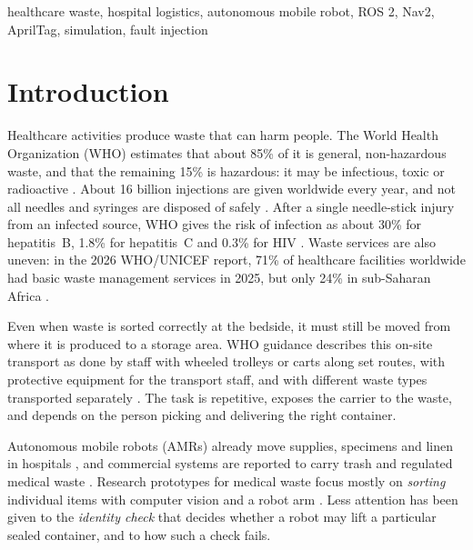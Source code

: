 \documentclass[conference]{IEEEtran}
\begin{document}
\begin{IEEEkeywords}
healthcare waste, hospital logistics, autonomous mobile robot, ROS 2, Nav2, AprilTag, simulation, fault injection
\end{IEEEkeywords}

\section{Introduction}
Healthcare activities produce waste that can harm people. The World Health Organization (WHO) estimates that about 85\% of it is general, non-hazardous waste, and that the remaining 15\% is hazardous: it may be infectious, toxic or radioactive \cite{who_hcw}. About 16 billion injections are given worldwide every year, and not all needles and syringes are disposed of safely \cite{who_hcw}. After a single needle-stick injury from an infected source, WHO gives the risk of infection as about 30\% for hepatitis~B, 1.8\% for hepatitis~C and 0.3\% for HIV \cite{who_injection}. Waste services are also uneven: in the 2026 WHO/UNICEF report, 71\% of healthcare facilities worldwide had basic waste management services in 2025, but only 24\% in sub-Saharan Africa \cite{jmp2026}.

Even when waste is sorted correctly at the bedside, it must still be moved from where it is produced to a storage area. WHO guidance describes this on-site transport as done by staff with wheeled trolleys or carts along set routes, with protective equipment for the transport staff, and with different waste types transported separately \cite{who_safe}. The task is repetitive, exposes the carrier to the waste, and depends on the person picking and delivering the right container.

Autonomous mobile robots (AMRs) already move supplies, specimens and linen in hospitals \cite{fragapane2020amr,li2026hospital,dei2026hosbot,valner2022rmf}, and commercial systems are reported to carry trash and regulated medical waste \cite{aethon,hfm2025froedtert}. Research prototypes for medical waste focus mostly on \emph{sorting} individual items with computer vision and a robot arm \cite{shaju2023medwaste,tasnim2022voice,bonifacio2025review}. Less attention has been given to the \emph{identity check} that decides whether a robot may lift a particular sealed container, and to how such a check fails.
\end{document}
